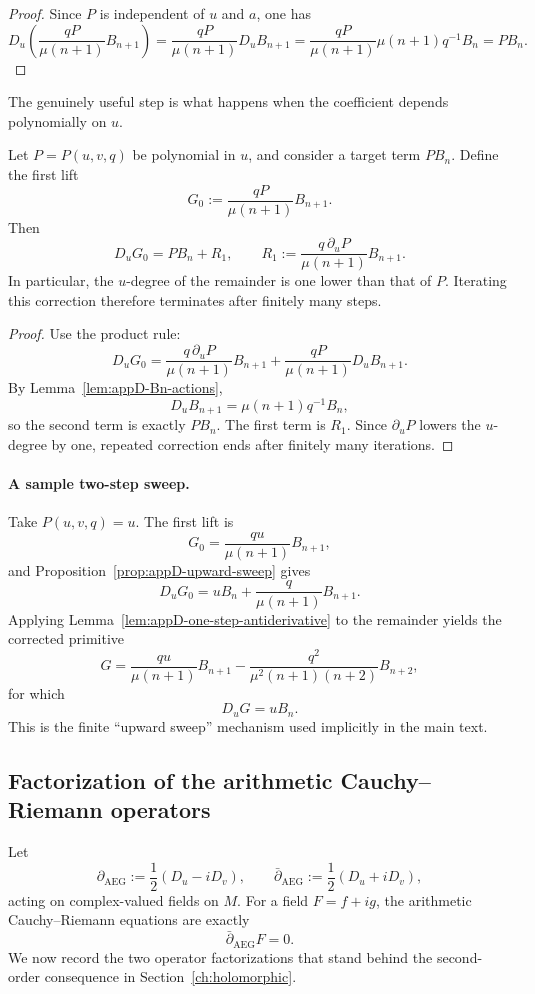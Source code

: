 \begin{proof}
Since $P$ is independent of $u$ and $a$, one has
\[
D_u\!\left(\frac{qP}{\mu(n+1)}B_{n+1}\right)
=\frac{qP}{\mu(n+1)}D_uB_{n+1}
=\frac{qP}{\mu(n+1)}\mu(n+1)q^{-1}B_n
=PB_n.
\]
\end{proof}

The genuinely useful step is what happens when the coefficient depends polynomially on $u$.

\begin{proposition}
\label{prop:appD-upward-sweep}
Let $P=P(u,v,q)$ be polynomial in $u$, and consider a target term $PB_n$.
Define the first lift
\[
G_0:=\frac{qP}{\mu(n+1)}B_{n+1}.
\]
Then
\[
D_uG_0=PB_n+R_1,
\qquad
R_1:=\frac{q\,\partial_uP}{\mu(n+1)}B_{n+1}.
\]
In particular, the $u$-degree of the remainder is one lower than that of $P$.
Iterating this correction therefore terminates after finitely many steps.
\end{proposition}

\begin{proof}
Use the product rule:
\[
D_uG_0
=\frac{q\,\partial_uP}{\mu(n+1)}B_{n+1}
+\frac{qP}{\mu(n+1)}D_uB_{n+1}.
\]
By Lemma~\ref{lem:appD-Bn-actions},
\[
D_uB_{n+1}=\mu(n+1)q^{-1}B_n,
\]
so the second term is exactly $PB_n$.
The first term is $R_1$.
Since $\partial_uP$ lowers the $u$-degree by one, repeated correction ends after finitely many iterations.
\end{proof}

\paragraph{A sample two-step sweep.}
Take $P(u,v,q)=u$.
The first lift is
\[
G_0=\frac{qu}{\mu(n+1)}B_{n+1},
\]
and Proposition~\ref{prop:appD-upward-sweep} gives
\[
D_uG_0=uB_n+\frac{q}{\mu(n+1)}B_{n+1}.
\]
Applying Lemma~\ref{lem:appD-one-step-antiderivative} to the remainder yields the corrected primitive
\[
G=\frac{qu}{\mu(n+1)}B_{n+1}-\frac{q^2}{\mu^2(n+1)(n+2)}B_{n+2},
\]
for which
\[
D_uG=uB_n.
\]
This is the finite ``upward sweep'' mechanism used implicitly in the main text.

\subsection{Factorization of the arithmetic Cauchy--Riemann operators}
\label{appD:factorization}

Let
\[
\partial_{\mathrm{AEG}}:=\frac12(D_u-iD_v),
\qquad
\bar\partial_{\mathrm{AEG}}:=\frac12(D_u+iD_v),
\]
acting on complex-valued fields on $M$.
For a field $F=f+ig$, the arithmetic Cauchy--Riemann equations are exactly
\[
\bar\partial_{\mathrm{AEG}}F=0.
\]
We now record the two operator factorizations that stand behind the second-order consequence in Section~\ref{ch:holomorphic}.

